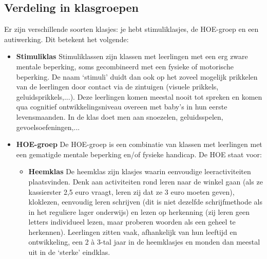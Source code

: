 \documentclass[a4paper,11pt]{article}
\theoremstyle{definition}
\begin{document}
\subsection{Verdeling in klasgroepen}\label{klasgroepen}
\noindent Er zijn verschillende soorten klasjes: je hebt stimuliklasjes, de 
HOE-groep en een autiwerking. Dit betekent het volgende:
\begin{itemize}
  \item \textbf{Stimuliklas} Stimuliklassen zijn klassen met leerlingen met een erg 
  zware mentale beperking, soms gecombineerd met een fysieke of motorische beperking. De naam `stimuli' duidt dan ook op het zoveel mogelijk prikkelen van de leerlingen
  door contact via de zintuigen (visuele prikkels, geluidsprikkels,...). Deze leerlingen komen meestal nooit tot spreken 
  en komen qua cognitief ontwikkelingsniveau overeen met baby's in hun eerste 
  levensmaanden. In de klas doet men aan snoezelen, geluidsspelen, 
  gevoelsoefeningen,...
  \item \textbf{HOE-groep}
  De HOE-groep is een combinatie van klassen met leerlingen met een gematigde 
  mentale beperking en/of fysieke handicap. De HOE staat voor:
  \begin{itemize}
        \item \textbf{Heemklas} De heemklas zijn klasjes waarin eenvoudige leeractiviteiten 
    plaatsvinden. Denk aan activiteiten rond leren naar de winkel gaan (als ze kassierster 2,5 euro vraagt, leren zij dat
    ze 3 euro moeten geven), kloklezen, eenvoudig leren schrijven (dit is niet dezelfde schrijfmethode als in het reguliere lager onderwijs) 
    en lezen op herkenning (zij leren geen letters individueel lezen, maar proberen woorden als een geheel te 
    herkennen). Leerlingen zitten vaak, afhankelijk van hun leeftijd en ontwikkeling, een 2 à 3-tal 
    jaar in de heemklasjes en monden dan meestal uit in de `sterke' eindklas. 
 



\end{itemize}
\end{itemize}
\end{document}
